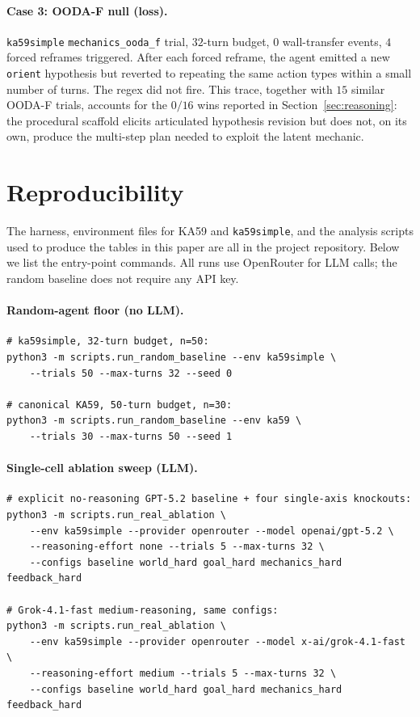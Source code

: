 \documentclass{article}
\begin{document}
\paragraph{Case 3: OODA-F null (loss).}
\texttt{ka59simple} \texttt{mechanics\_ooda\_f} trial, $32$-turn budget, $0$ wall-transfer events, $4$ forced reframes triggered. After each forced reframe, the agent emitted a new \texttt{orient} hypothesis but reverted to repeating the same action types within a small number of turns. The regex did not fire. This trace, together with $15$ similar OODA-F trials, accounts for the $0/16$ wins reported in Section~\ref{sec:reasoning}: the procedural scaffold elicits articulated hypothesis revision but does not, on its own, produce the multi-step plan needed to exploit the latent mechanic.

\section{Reproducibility}
\label{app:repro}
The harness, environment files for KA59 and \texttt{ka59simple}, and the analysis scripts used to produce the tables in this paper are all in the project repository. Below we list the entry-point commands. All runs use OpenRouter for LLM calls; the random baseline does not require any API key.

\paragraph{Random-agent floor (no LLM).}
\begin{verbatim}
# ka59simple, 32-turn budget, n=50:
python3 -m scripts.run_random_baseline --env ka59simple \
    --trials 50 --max-turns 32 --seed 0

# canonical KA59, 50-turn budget, n=30:
python3 -m scripts.run_random_baseline --env ka59 \
    --trials 30 --max-turns 50 --seed 1
\end{verbatim}

\paragraph{Single-cell ablation sweep (LLM).}
\begin{verbatim}
# explicit no-reasoning GPT-5.2 baseline + four single-axis knockouts:
python3 -m scripts.run_real_ablation \
    --env ka59simple --provider openrouter --model openai/gpt-5.2 \
    --reasoning-effort none --trials 5 --max-turns 32 \
    --configs baseline world_hard goal_hard mechanics_hard feedback_hard

# Grok-4.1-fast medium-reasoning, same configs:
python3 -m scripts.run_real_ablation \
    --env ka59simple --provider openrouter --model x-ai/grok-4.1-fast \
    --reasoning-effort medium --trials 5 --max-turns 32 \
    --configs baseline world_hard goal_hard mechanics_hard feedback_hard
\end{verbatim}
\end{document}
